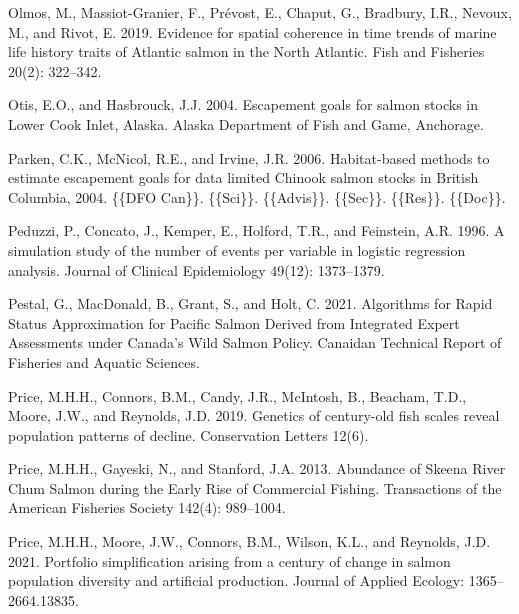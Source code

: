 \documentclass[11pt]{book}
\begin{document}
\begin{CSLReferences}{1}{0}
%
Olmos, M., Massiot-Granier, F., Prévost, E., Chaput, G., Bradbury, I.R., Nevoux, M., and Rivot, E. 2019. Evidence for spatial coherence in time trends of marine life history traits of {Atlantic} salmon in the {North Atlantic}. Fish and Fisheries 20(2): 322--342.

%
Otis, E.O., and Hasbrouck, J.J. 2004. Escapement goals for salmon stocks in {Lower Cook Inlet}, {Alaska}. {Alaska Department of Fish and Game}, {Anchorage}.

%
Parken, C.K., McNicol, R.E., and Irvine, J.R. 2006. Habitat-based methods to estimate escapement goals for data limited {Chinook} salmon stocks in {British Columbia}, 2004. \{\{DFO Can\}\}. \{\{Sci\}\}. \{\{Advis\}\}. \{\{Sec\}\}. \{\{Res\}\}. \{\{Doc\}\}.

%
Peduzzi, P., Concato, J., Kemper, E., Holford, T.R., and Feinstein, A.R. 1996. A simulation study of the number of events per variable in logistic regression analysis. Journal of Clinical Epidemiology 49(12): 1373--1379.

%
Pestal, G., MacDonald, B., Grant, S., and Holt, C. 2021. Algorithms for {Rapid Status Approximation} for {Pacific Salmon Derived} from {Integrated Expert Assessments} under {Canada}'s {Wild Salmon Policy}. Canaidan Technical Report of Fisheries and Aquatic Sciences.

%
Price, M.H.H., Connors, B.M., Candy, J.R., McIntosh, B., Beacham, T.D., Moore, J.W., and Reynolds, J.D. 2019. Genetics of century-old fish scales reveal population patterns of decline. Conservation Letters 12(6).

%
Price, M.H.H., Gayeski, N., and Stanford, J.A. 2013. Abundance of {Skeena River Chum Salmon} during the {Early Rise} of {Commercial Fishing}. Transactions of the American Fisheries Society 142(4): 989--1004.

%
Price, M.H.H., Moore, J.W., Connors, B.M., Wilson, K.L., and Reynolds, J.D. 2021. Portfolio simplification arising from a century of change in salmon population diversity and artificial production. Journal of Applied Ecology: 1365--2664.13835.


\end{CSLReferences}
\end{document}
